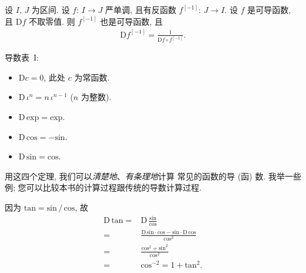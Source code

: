 \begin{theorem}
    设 $I$, $J$ 为区间.
    设 $f$: $I \to J$ 严单调,
    且有反函数 $f^{[-1]}$: $J \to I$.
    设 $f$ 是可导函数, 且 $\mathrm{D}f$ 不取零值.
    则 $f^{[-1]}$ 也是可导函数, 且
    \begin{align*}
        \mathrm{D} f^{[-1]} = \frac{1}{\mathrm{D}f \circ f^{[-1]}}.
    \end{align*}
\end{theorem}

\begin{theorem}
    导数表~I:
    \begin{itemize}
        \item $\mathrm{D} c = 0$,
              此处 $c$ 为常函数.
        \item $\mathrm{D}\, \iota^n = n \, \iota^{n - 1}$
              ($n$ 为整数).
        \item $\mathrm{D}\, \mathrm{exp} = \mathrm{exp}$.
        \item $\mathrm{D}\, \mathrm{cos} = -\mathrm{sin}$.
        \item $\mathrm{D}\, \mathrm{sin} = \mathrm{cos}$.
    \end{itemize}
\end{theorem}

用这四个定理,
我们可以\emph{清楚地}、\emph{有条理地}计算%
常见的函数的导 (函) 数.
我举一些例;
您可以比较本书的计算过程跟传统的导数计算过程.

\begin{example}
    因为 $\mathrm{tan} = {\mathrm{sin}}\,/\,{\mathrm{cos}}$,
    故
    \begin{align*}
        \mathrm{D}\, \mathrm{tan}
        = {} & \mathrm{D}\, \frac{\mathrm{sin}}{\mathrm{cos}}                                                                     \\
        = {} & \frac{\mathrm{D}\, \mathrm{sin} \cdot \mathrm{cos} - \mathrm{sin} \cdot \mathrm{D}\, \mathrm{cos}}{\mathrm{cos}^2} \\
        = {} & \frac{\mathrm{cos}^2 + \mathrm{sin}^2}{\mathrm{cos}^2}                                                             \\
        = {} & \mathrm{cos}^{-2} = 1 + \mathrm{tan}^2.
    \end{align*}
\end{example}

